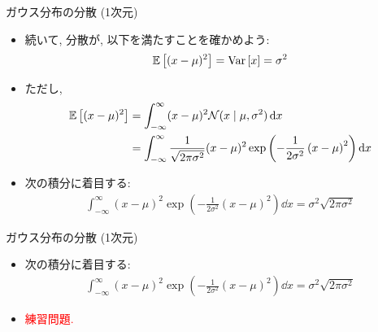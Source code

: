 \documentclass[dvipdfmx,notheorems,t]{beamer}
\begin{document}
\begin{frame}{ガウス分布の分散 (1次元)}
\begin{itemize}
  \item 続いて, 分散が, 以下を満たすことを確かめよう:
  \begin{align*}
    \operatorname{\mathbb{E}} \left[ (x - \mu)^2 \right] = \operatorname{Var} \left[ x \right] = \sigma^2
  \end{align*}
  \item ただし,
  \begin{align*}
    \operatorname{\mathbb{E}} \left[ (x - \mu)^2 \right] &= \int_{-\infty}^\infty (x - \mu)^2 \mathcal{N}(x \mid \mu, \sigma^2) \dd{x} \\
      &= \int_{-\infty}^\infty \frac{1}{\sqrt{2 \pi \sigma^2}} (x - \mu)^2
        \exp \left( -\frac{1}{2 \sigma^2} \left( x - \mu \right)^2 \right) \dd{x}
  \end{align*}
  \item 次の積分に着目する:
  \begin{align*}
    \int_{-\infty}^\infty (x - \mu)^2
      \exp \left( -\frac{1}{2 \sigma^2} \left( x - \mu \right)^2 \right) \dd{x}
      = \sigma^2 \sqrt{2 \pi \sigma^2}
  \end{align*}
\end{itemize}
\end{frame}

\begin{frame}{ガウス分布の分散 (1次元)}
\begin{itemize}
  \item 次の積分に着目する:
  \begin{align*}
    \int_{-\infty}^\infty (x - \mu)^2
      \exp \left( -\frac{1}{2 \sigma^2} \left( x - \mu \right)^2 \right) \dd{x}
      = \sigma^2 \sqrt{2\pi \sigma^2}
  \end{align*}
  \item \textcolor{red}{練習問題.}
\end{itemize}
\end{frame}
\end{document}
